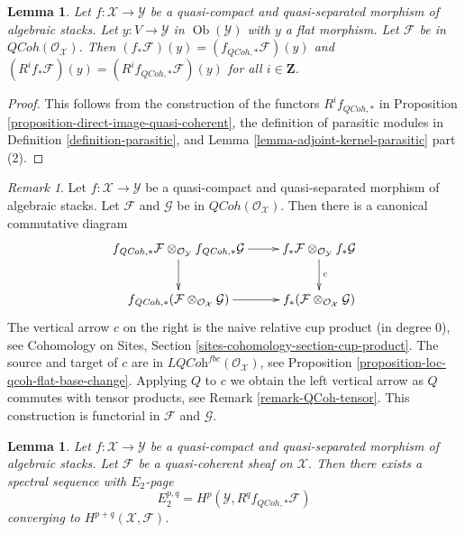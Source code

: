 \documentclass{stacks-project}
\theoremstyle{plain}
\newtheorem{lemma}[subsection]{Lemma}
\theoremstyle{definition}
\theoremstyle{remark}
\newtheorem{remark}[subsection]{Remark}
\numberwithin{equation}{subsection}
\def\Ob{\mathop{\mathrm{Ob}}\nolimits}
\def\QCoh{\mathit{QCoh}}
\begin{document}
\begin{lemma}
\label{lemma-direct-image-quasi-coherent-over-flat}
Let $f : \mathcal{X} \to \mathcal{Y}$ be a quasi-compact and quasi-separated
morphism of algebraic stacks. Let $y : V \to \mathcal{Y}$ in $\Ob(\mathcal{Y})$
with $y$ a flat morphism. Let $\mathcal{F}$ be in
$\QCoh(\mathcal{O}_\mathcal{X})$.
Then $(f_*\mathcal{F})(y) = (f_{\QCoh, *}\mathcal{F})(y)$
and $(R^if_*\mathcal{F})(y) = (R^if_{\QCoh, *}\mathcal{F})(y)$
for all $i \in \mathbf{Z}$.
\end{lemma}

\begin{proof}
This follows from the construction of the functors $R^if_{\QCoh, *}$ in
Proposition \ref{proposition-direct-image-quasi-coherent},
the definition of parasitic modules in Definition \ref{definition-parasitic},
and Lemma \ref{lemma-adjoint-kernel-parasitic} part (2).
\end{proof}

\begin{remark}
\label{remark-direct-image-quasi-coherent-tensor}
Let $f : \mathcal{X} \to \mathcal{Y}$ be a quasi-compact and quasi-separated
morphism of algebraic stacks. Let $\mathcal{F}$ and $\mathcal{G}$ be in
$\QCoh(\mathcal{O}_\mathcal{X})$. Then there is a canonical commutative
diagram
$$
\xymatrix{
f_{\QCoh, *}\mathcal{F}
\otimes_{\mathcal{O}_\mathcal{Y}}
f_{\QCoh, *}\mathcal{G} \ar[r] \ar[d] &
f_*\mathcal{F}
\otimes_{\mathcal{O}_\mathcal{Y}}
f_*\mathcal{G} \ar[d]^c \\
f_{\QCoh, *}(\mathcal{F}
\otimes_{\mathcal{O}_\mathcal{X}}
\mathcal{G}) \ar[r] &
f_*(\mathcal{F}
\otimes_{\mathcal{O}_\mathcal{X}}
\mathcal{G})
}
$$
The vertical arrow $c$ on the right is the naive relative cup product
(in degree $0$),
see Cohomology on Sites, Section \ref{sites-cohomology-section-cup-product}.
The source and target of $c$ are in
$\textit{LQCoh}^{fbc}(\mathcal{O}_\mathcal{X})$, see
Proposition \ref{proposition-loc-qcoh-flat-base-change}.
Applying $Q$ to $c$ we obtain the left vertical arrow
as $Q$ commutes with tensor products, see
Remark \ref{remark-QCoh-tensor}.
This construction is functorial in $\mathcal{F}$ and $\mathcal{G}$.
\end{remark}

\begin{lemma}
\label{lemma-leray}
Let $f : \mathcal{X} \to \mathcal{Y}$
be a quasi-compact and quasi-separated morphism of algebraic stacks.
Let $\mathcal{F}$ be a quasi-coherent sheaf on $\mathcal{X}$. Then
there exists a spectral sequence with $E_2$-page
$$
E_2^{p, q} = H^p(\mathcal{Y}, R^qf_{\QCoh, *}\mathcal{F})
$$
converging to $H^{p + q}(\mathcal{X}, \mathcal{F})$.
\end{lemma}
\end{document}
